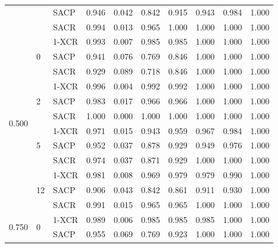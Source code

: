 \begin{longtable}[c]{|l|l|l|l|l|l|l|l|l|l|}
                        &                     & SACP   & 0.946 & 0.042 & 0.842 & 0.915 & 0.943 & 0.984 & 1.000 \\ \cline{3-10} 
                        &                     & SACR   & 0.994 & 0.013 & 0.965 & 1.000 & 1.000 & 1.000 & 1.000 \\ \hline
\multirow{12}{*}{0.500} & \multirow{3}{*}{0}  & 1-XCR  & 0.993 & 0.007 & 0.985 & 0.985 & 1.000 & 1.000 & 1.000 \\ \cline{3-10} 
                        &                     & SACP   & 0.941 & 0.076 & 0.769 & 0.846 & 1.000 & 1.000 & 1.000 \\ \cline{3-10} 
                        &                     & SACR   & 0.929 & 0.089 & 0.718 & 0.846 & 1.000 & 1.000 & 1.000 \\ \cline{2-10} 
                        & \multirow{3}{*}{2}  & 1-XCR  & 0.996 & 0.004 & 0.992 & 0.992 & 1.000 & 1.000 & 1.000 \\ \cline{3-10} 
                        &                     & SACP   & 0.983 & 0.017 & 0.966 & 0.966 & 1.000 & 1.000 & 1.000 \\ \cline{3-10} 
                        &                     & SACR   & 1.000 & 0.000 & 1.000 & 1.000 & 1.000 & 1.000 & 1.000 \\ \cline{2-10} 
                        & \multirow{3}{*}{5}  & 1-XCR  & 0.971 & 0.015 & 0.943 & 0.959 & 0.967 & 0.984 & 1.000 \\ \cline{3-10} 
                        &                     & SACP   & 0.952 & 0.037 & 0.878 & 0.929 & 0.949 & 0.976 & 1.000 \\ \cline{3-10} 
                        &                     & SACR   & 0.974 & 0.037 & 0.871 & 0.929 & 1.000 & 1.000 & 1.000 \\ \cline{2-10} 
                        & \multirow{3}{*}{12} & 1-XCR  & 0.981 & 0.008 & 0.969 & 0.979 & 0.979 & 0.990 & 1.000 \\ \cline{3-10} 
                        &                     & SACP   & 0.906 & 0.043 & 0.842 & 0.861 & 0.911 & 0.930 & 1.000 \\ \cline{3-10} 
                        &                     & SACR   & 0.991 & 0.015 & 0.965 & 0.965 & 1.000 & 1.000 & 1.000 \\ \hline
\multirow{12}{*}{0.750} & \multirow{3}{*}{0}  & 1-XCR  & 0.989 & 0.006 & 0.985 & 0.985 & 0.985 & 1.000 & 1.000 \\ \cline{3-10} 
                        &                     & SACP   & 0.955 & 0.069 & 0.769 & 0.923 & 1.000 & 1.000 & 1.000 \\ \cline{3-10} 

\end{longtable}
